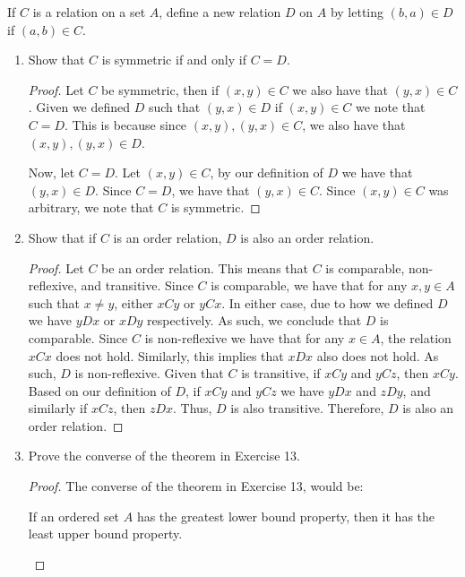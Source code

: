 \documentclass[12pt]{article}
\begin{document}
 If $C$ is a relation on a set $A$, define a new relation $D$ on $A$ 
by letting $(b, a) \in D$ if $(a, b) \in C$.
\begin{enumerate}[label=(\alph*)]
	\item Show that $C$ is symmetric if and only if $C = D$.
	\begin{proof}
		Let $C$ be symmetric, then if $(x, y) \in C$ we also have that $(y, x) \in C$.
		Given we defined $D$ such that $(y, x) \in D$ if $(x, y) \in C$ we note that 
		$C = D$. This is because since $(x, y), (y, x) \in C$, we also have that 
		$(x,y), (y, x) \in D$.
		
		Now, let $C = D$.
		Let $(x, y) \in C$, by our definition of $D$ we have that $(y, x) \in D$.
		Since $C = D$, we have that $(y, x) \in C$. Since $(x, y) \in C$ was arbitrary,
		we note that $C$ is symmetric.
	\end{proof}
	\item Show that if $C$ is an order relation, $D$ is also an order relation.
	\begin{proof}
		Let $C$ be an order relation. This means that $C$ is comparable, non-reflexive, and transitive.
		Since $C$ is comparable, we have that for any $x, y \in A$ such that $x \neq y$, either
		$xCy$ or $yCx$. In either case, due to how we defined $D$ we have $yDx$ or $xDy$ respectively.
		As such, we conclude that $D$ is comparable. Since $C$ is non-reflexive we have that 
		for any $x \in A$, the relation $xCx$ does not hold. Similarly, this implies that 
		$xDx$ also does not hold. As such, $D$ is non-reflexive. Given that $C$ is transitive,
		if $xCy$ and $yCz$, then $xCy$. Based on our definition of $D$, if $xCy$ and $yCz$
		we have $yDx$ and $zDy$, and similarly if $xCz$, then $zDx$. Thus, $D$ is also transitive.
		Therefore, $D$ is also an order relation.
	\end{proof}
	\item Prove the converse of the theorem in Exercise 13.
	\begin{proof}
		The converse of the theorem in Exercise 13, would be:
		
		\begin{theorem}
			If an ordered set $A$ has the greatest lower bound property, then it has the least
			upper bound property.
		\end{theorem}
		

\end{proof}
\end{enumerate}
\end{document}
